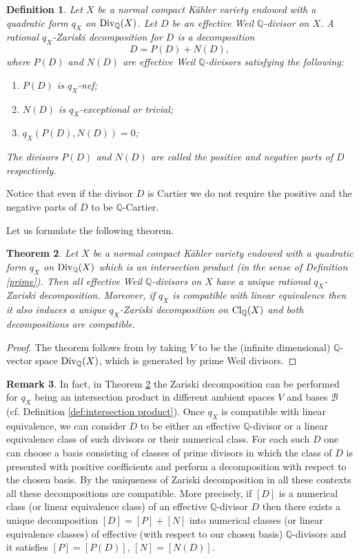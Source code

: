 \documentclass[12pt,reqno]{amsart}
\def\Q{{\mathbb Q}}
\def\Cl{\mathop{\rm Cl}\nolimits}
\def\Div{\mathop{\rm Div}\nolimits}
\newtheorem{thm}{Theorem}[section]
\newtheorem{definition}[thm]{Definition}
\theoremstyle{plain}
\theoremstyle{definition}
\newtheorem{remark}[thm]{Remark}
\begin{document}
\begin{definition}\label{definition:q-Zar}
Let $X$ be a normal compact K\"ahler variety endowed with a quadratic form $q_{X}$ on $\Div_{\Q}(X)$. Let $D$ be an effective Weil $\Q$-divisor on $X$.
A  rational  $q_{X}$-Zariski decomposition for $D$ is a decomposition 
$$
 D= P(D) + N(D),
$$
where $P(D)$ and $N(D)$ are effective Weil  $\Q$-divisors satisfying the following:
\begin{enumerate}
\item[1)] $P(D)$ is $q_{X}$-nef;
\item[2)] $N(D)$ is $q_{X}$-exceptional or trivial;
\item[3)] $q_{X}(P(D),N(D))=0$;
\end{enumerate}
The divisors $P(D)$ and $N(D)$ are called the positive and negative parts of $D$ respectively.
\end{definition}
Notice that even if the divisor $D$ is Cartier we do not require the positive and the negative parts of $D$ to be 
$\Q$-Cartier.

Let us formulate the following theorem.
\begin{thm}\label{thm:q-Zar}
Let $X$ be a normal compact K\"ahler variety endowed with a quadratic form $q_{X}$ on  $\Div_{\Q}(X)$ which is an intersection product  (in the sense of Definition \ref{prime}).
Then all effective Weil $\Q$-divisors on $X$ have a unique rational  $q_{X}$-Zariski decomposition. Moreover, if $q_X$ is compatible with linear equivalence then it also induces a unique $q_X$-Zariski decomposition on $\Cl_{\Q}(X)$ and both decompositions are compatible.
\end{thm}
\begin{proof}The theorem follows from \cite[Theorem 3.3]{Baueretal} by taking $V$ to be the (infinite dimensional) $\mathbb{Q}$-vector space $\Div_{\mathbb Q}(X)$, which is generated by prime Weil divisors. 
\end{proof}
 \begin{remark} In fact, in Theorem \ref{thm:q-Zar} the Zariski decomposition can be performed for $q_X$ being an intersection product in different ambient spaces $V$ and bases $\mathcal B$ (cf. Definition \ref{def:intersection product}). Once $q_X$ is compatible with linear equivalence, we can consider $D$  to be either an effective $\mathbb{Q}$-divisor or a linear equivalence class of such divisors or their  numerical class. For each such $D$ one can choose a basis consisting of classes of prime divisors in which the class of $D$ is presented with positive coefficients and perform a decomposition with respect to the chosen basis.  By the uniqueness of Zariski decomposition in all these contexts all these decompositions are compatible. More precisely, if $[D]$ is a numerical class (or linear equivalence class) of an effective $\mathbb{Q}$-divisor $D$ then there exists a unique decomposition $[D]=[P]+[N]$ into numerical classes (or linear equivalence classes)  of effective (with respect to our chosen basis) $\mathbb{Q}$-divisors  and it satisfies $[P]=[P(D)]$, $[N]=[N(D)]$. 
\end{remark}
\end{document}
